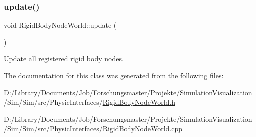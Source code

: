 \subsubsection{\texorpdfstring{update()}{update()}}
{\footnotesize\ttfamily void Rigid\+Body\+Node\+World\+::update (\begin{DoxyParamCaption}{ }\end{DoxyParamCaption})}



Update all registered rigid body nodes. 



The documentation for this class was generated from the following files\+:\begin{DoxyCompactItemize}
\item 
D\+:/\+Library/\+Documents/\+Job/\+Forschungsmaster/\+Projekte/\+Simulation\+Visualization/\+Sim/\+Sim/src/\+Physic\+Interfaces/\mbox{\hyperlink{_rigid_body_node_world_8h}{Rigid\+Body\+Node\+World.\+h}}\item 
D\+:/\+Library/\+Documents/\+Job/\+Forschungsmaster/\+Projekte/\+Simulation\+Visualization/\+Sim/\+Sim/src/\+Physic\+Interfaces/\mbox{\hyperlink{_rigid_body_node_world_8cpp}{Rigid\+Body\+Node\+World.\+cpp}}\end{DoxyCompactItemize}
